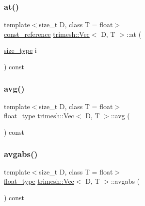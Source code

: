 \subsubsection{\texorpdfstring{at()}{at()}\hspace{0.1cm}{\footnotesize\ttfamily [2/2]}}
{\footnotesize\ttfamily template$<$size\+\_\+t D, class T = float$>$ \\
\hyperlink{classtrimesh_1_1Vec_a5ae45a41f93e04534f46b74dee5c6701}{const\+\_\+reference} \hyperlink{classtrimesh_1_1Vec}{trimesh\+::\+Vec}$<$ D, T $>$\+::at (\begin{DoxyParamCaption}\item[{\hyperlink{classtrimesh_1_1Vec_a65397e05ed96e7723cf2d54dfff0ad0a}{size\+\_\+type}}]{i }\end{DoxyParamCaption}) const\hspace{0.3cm}{\ttfamily [inline]}}

\mbox{\label{classtrimesh_1_1Vec_a2793173421d466ffd26076f573de459c}} 
\subsubsection{\texorpdfstring{avg()}{avg()}}
{\footnotesize\ttfamily template$<$size\+\_\+t D, class T = float$>$ \\
\hyperlink{classtrimesh_1_1Vec_a2593716457a143008832235a3e4a9155}{float\+\_\+type} \hyperlink{classtrimesh_1_1Vec}{trimesh\+::\+Vec}$<$ D, T $>$\+::avg (\begin{DoxyParamCaption}{ }\end{DoxyParamCaption}) const\hspace{0.3cm}{\ttfamily [inline]}}

\mbox{\label{classtrimesh_1_1Vec_a9d36cdd7de75f5dc18f15610f667e12a}} 
\subsubsection{\texorpdfstring{avgabs()}{avgabs()}}
{\footnotesize\ttfamily template$<$size\+\_\+t D, class T = float$>$ \\
\hyperlink{classtrimesh_1_1Vec_a2593716457a143008832235a3e4a9155}{float\+\_\+type} \hyperlink{classtrimesh_1_1Vec}{trimesh\+::\+Vec}$<$ D, T $>$\+::avgabs (\begin{DoxyParamCaption}{ }\end{DoxyParamCaption}) const\hspace{0.3cm}{\ttfamily [inline]}}

